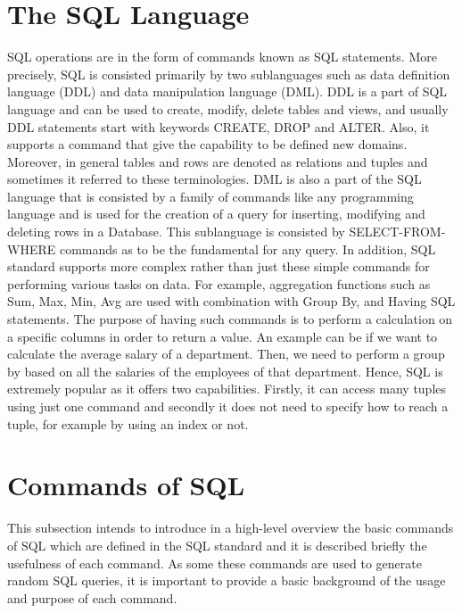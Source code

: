 \section{The SQL Language}
SQL operations are in the form of commands known as SQL statements. More precisely, SQL is consisted primarily by two sublanguages such as data definition language (DDL) and data manipulation language (DML). DDL is a part of SQL language and can be used to create, modify, delete tables and views, and usually DDL statements start with keywords CREATE, DROP and ALTER. Also, it supports a command that give the capability to be defined new domains. Moreover, in general tables and rows are denoted as relations and tuples and sometimes it referred to these terminologies. DML is also a part of the SQL language that is consisted by a family of commands like any programming language and is used for the creation of a query for inserting, modifying and deleting rows in a Database. This sublanguage is consisted by SELECT-FROM-WHERE commands as to be the fundamental for any query. In addition, SQL standard supports more complex rather than just these simple commands for performing various tasks on data. For example, aggregation functions such as Sum, Max, Min, Avg are used with combination with Group By, and Having SQL statements. The purpose of having such commands is to perform a calculation on a specific  columns in order to return a value. An example can be if we want to calculate the average salary of a department. Then, we need to perform a group by based on all the salaries of the employees of that department. 
Hence, SQL is extremely popular as it offers two capabilities. Firstly, it can access many tuples using just one command and secondly it does not need to specify how to reach a tuple, for example by using an index or not. 

\section{Commands of SQL}
This subsection intends to introduce in a high-level overview the basic commands of SQL which are defined in the SQL standard and it is described briefly the usefulness of each command. As some these commands are used to generate random SQL queries, it is important to provide a basic background of the usage and purpose of each command. 

